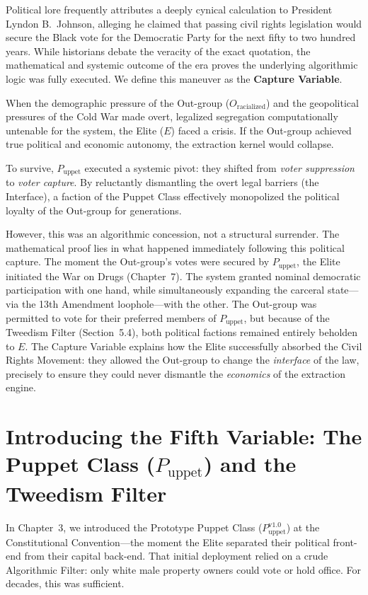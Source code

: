 \documentclass[12pt,openany]{book}
\begin{document}
Political lore frequently attributes a deeply cynical calculation to President Lyndon B.\ Johnson, alleging he claimed that passing civil rights legislation would secure the Black vote for the Democratic Party for the next fifty to two hundred years. While historians debate the veracity of the exact quotation, the mathematical and systemic outcome of the era proves the underlying algorithmic logic was fully executed. We define this maneuver as the \textbf{Capture Variable}.

When the demographic pressure of the Out-group ($O_{\text{racialized}}$) and the geopolitical pressures of the Cold War made overt, legalized segregation computationally untenable for the system, the Elite ($E$) faced a crisis. If the Out-group achieved true political and economic autonomy, the extraction kernel would collapse.

To survive, $P_{\text{uppet}}$ executed a systemic pivot: they shifted from \textit{voter suppression} to \textit{voter capture}. By reluctantly dismantling the overt legal barriers (the Interface), a faction of the Puppet Class effectively monopolized the political loyalty of the Out-group for generations.

However, this was an algorithmic concession, not a structural surrender. The mathematical proof lies in what happened immediately following this political capture. The moment the Out-group's votes were secured by $P_{\text{uppet}}$, the Elite initiated the War on Drugs (Chapter~7). The system granted nominal democratic participation with one hand, while simultaneously expanding the carceral state---via the 13th Amendment loophole---with the other. The Out-group was permitted to vote for their preferred members of $P_{\text{uppet}}$, but because of the Tweedism Filter (Section~5.4), both political factions remained entirely beholden to $E$. The Capture Variable explains how the Elite successfully absorbed the Civil Rights Movement: they allowed the Out-group to change the \textit{interface} of the law, precisely to ensure they could never dismantle the \textit{economics} of the extraction engine.


\section{Introducing the Fifth Variable: The Puppet Class ($P_{\text{uppet}}$) and the Tweedism Filter}

In Chapter~3, we introduced the Prototype Puppet Class ($P_{\text{uppet}}^{\text{v1.0}}$) at the Constitutional Convention---the moment the Elite separated their political front-end from their capital back-end. That initial deployment relied on a crude Algorithmic Filter: only white male property owners could vote or hold office. For decades, this was sufficient.
\end{document}
